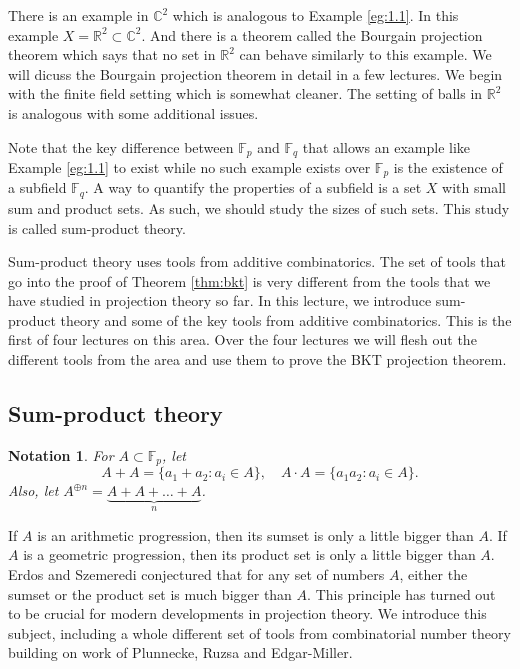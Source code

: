 \documentclass[12pt]{amsart}
\newtheorem{notation}[theorem]{Notation}
\newcommand{\F}{\mathbb{F}}
\newcommand{\CC}{\mathbb{C}}
\newcommand{\RR}{\mathbb{R}}
\begin{document}
There is an example in $\CC^2$ which is analogous to Example \ref{eg:1.1}.   In this example $X = \RR^2 \subset \CC^2$.   And there is a theorem called the Bourgain projection theorem which says that no set in $\RR^2$ can behave similarly to this example.  We will dicuss the Bourgain projection theorem in detail in a few lectures.   We begin with the finite field setting which is somewhat cleaner.   The setting of balls in $\RR^2$ is analogous with some additional issues.


Note that the key difference between $\F_p$ and $\F_q$ that allows an example like Example \ref{eg:1.1} to exist while no such example exists over $\F_p$ is the existence of a subfield $\F_q$. A way to quantify the properties of a subfield is a set $X$ with small sum and product sets. As such, we should study the sizes of such sets.   This study is called sum-product theory.   

Sum-product theory uses tools from additive combinatorics.   The set of tools that go into the proof of Theorem \ref{thm:bkt} is very different from the tools that we have studied in projection theory so far.   In this lecture,  we introduce sum-product theory and some of the key tools from additive combinatorics.   This is the first of four lectures on this area.   Over the four lectures we will flesh out the different tools from the area and use them to prove the BKT projection theorem.



\subsection{Sum-product theory}

\begin{notation}
    For $A\subset\F_p$, let
    $$A+A=\{a_1+a_2:a_i\in A\},\quad A\cdot A=\{a_1a_2:a_i\in A\}.$$
    Also, let $A^{\oplus n}=\underbrace{A+A+\dots+A}_n$.
\end{notation}


If $A$ is an arithmetic progression,  then its sumset is only a little bigger than $A$.   If $A$ is a geometric progression, then its product set is only a little bigger than $A$.   Erdos and Szemeredi conjectured that for any set of numbers $A$,  either the sumset or the product set is much bigger than $A$.   This principle has turned out to be crucial for modern developments in projection theory.   We introduce this subject,  including a whole different set of tools from combinatorial number theory building on work of Plunnecke, Ruzsa and Edgar-Miller.
\end{document}
